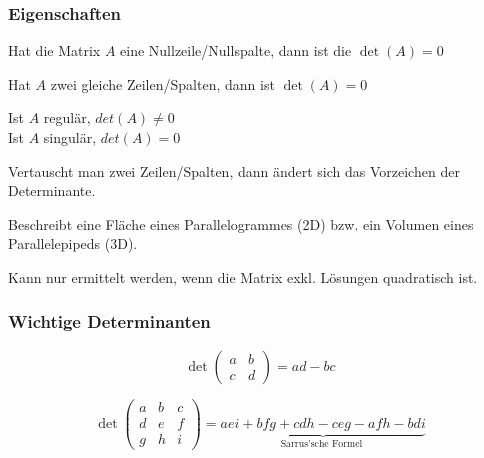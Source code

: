 \subsubsection{Eigenschaften}

\begin{compactitem}
	\item Hat die Matrix $A$ eine Nullzeile/Nullspalte, dann ist die $\operatorname{det}(A) = 0$
	\item Hat $A$ zwei gleiche Zeilen/Spalten, dann ist $\operatorname{det}(A) = 0$
	\item Ist $A$ regulär, $det(A) \neq 0$\\
	Ist $A$ singulär, $det(A) = 0$
	\item Vertauscht man zwei Zeilen/Spalten, dann ändert sich das Vorzeichen der Determinante.
	\item Beschreibt eine Fläche eines Parallelogrammes (2D) bzw. ein Volumen eines Parallelepipeds (3D).
	\item Kann nur ermittelt werden, wenn die Matrix exkl. Lösungen quadratisch ist.
\end{compactitem}

\subsubsection{Wichtige Determinanten}
\begin{multicols}{2}
	\begin{equation*}
		\operatorname{det}\left(\begin{array}{ll}
		a & b \\
		c & d
		\end{array}\right)=a d-b c
	\end{equation*}
	
	\columnbreak
	
	\begin{equation*}
		\operatorname{det}\left(\begin{array}{ccc}
		a & b & c \\
		d & e & f \\
		g & h & i
		\end{array}\right)=\underbrace{a e i+b f g+c d h-c e g-a f h-b d i}_{\text {Sarrus'sche Formel }}
	\end{equation*}
\end{multicols}

